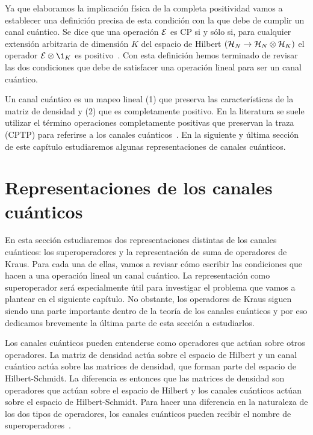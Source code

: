 Ya que elaboramos la implicación física de la completa positividad 
vamos a establecer una definición precisa de esta condición con la
que debe de cumplir un canal cuántico.
Se dice que una operación $\mathcal{E}$ es CP si 
y sólo si, para cualquier extensión arbitraria de dimensión $K$ 
del espacio de Hilbert $(\mathcal{H}_N \rightarrow \mathcal{H}_N \otimes \mathcal{H}_K)$ 
el operador $\E\otimes\1_K$ es positivo~\cite{bengtsson_zyczkowski_2017}. 
Con esta definición hemos terminado de revisar las dos condiciones que 
debe de satisfacer una operación lineal para ser un 
canal cuántico.

Un canal cuántico es un mapeo lineal  (1) que preserva las características
de la matriz de densidad y (2) que es completamente positivo. 
En la literatura se suele utilizar el término operaciones 
completamente positivas que preservan la traza 
(CPTP) para referirse a los canales 
cuánticos~\cite{bengtsson_zyczkowski_2017}. 
En la siguiente y última sección de este capítulo estudiaremos 
algunas representaciones de canales cuánticos. 
\section{Representaciones de los canales cuánticos} %
\label{sec:qtm-channels-representation}
En esta sección estudiaremos dos representaciones distintas de 
los canales cuánticos: los superoperadores y la representación 
de suma de operadores de Kraus. Para cada una de ellas, vamos a revisar
cómo escribir las condiciones que hacen a una operación lineal un 
canal cuántico. La representación como superoperador 
será especialmente útil para investigar el problema
que vamos a plantear en el siguiente capítulo. No obstante, los 
operadores de Kraus siguen siendo una parte importante dentro 
de la teoría de los canales cuánticos y por eso dedicamos brevemente
la última parte de esta sección a estudiarlos.

Los canales cuánticos pueden entenderse como operadores 
que actúan sobre otros operadores. 
La matriz de densidad actúa sobre 
el espacio de Hilbert y un canal cuántico actúa sobre las matrices de 
densidad, que forman parte del espacio de Hilbert-Schmidt. 
La diferencia es entonces que las matrices de densidad 
son operadores que actúan sobre el espacio de 
Hilbert y los canales cuánticos actúan sobre el espacio 
de Hilbert-Schmidt. Para hacer una diferencia en 
la naturaleza de los dos tipos de operadores, los canales cuánticos 
pueden recibir el nombre de superoperadores~\cite{preskill1998lecture}.

